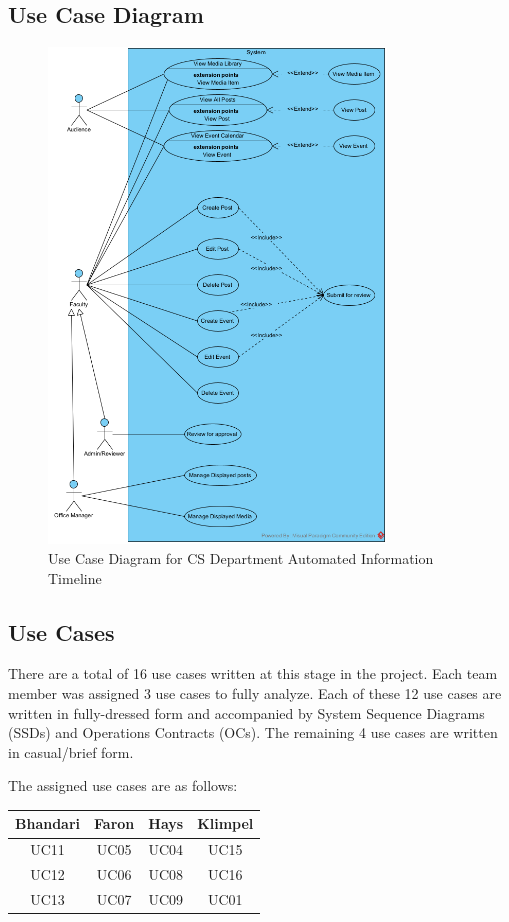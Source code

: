 \documentclass{article}
\begin{document}
\subsection{Use Case Diagram}
\begin{figure}[H]
    \centering
    \includegraphics[width=0.8\textwidth]{images/UCD.png}
    \centering
    \caption{Use Case Diagram for CS Department Automated Information Timeline}
\end{figure}

\subsection{Use Cases}
There are a total of 16 use cases written at this stage in the project. Each team member was assigned 3 use cases to fully analyze. Each of these 12 use cases are written in fully-dressed form and accompanied by System Sequence Diagrams (SSDs) and Operations Contracts (OCs). The remaining 4 use cases are written in casual/brief form.

The assigned use cases are as follows:

\begin{center}
    \begin{tabular}{ | c | c | c | c | }
        \hline
        Bhandari & Faron & Hays & Klimpel \\
        \hline
        UC11 & UC05 & UC04 & UC15 \\
        \hline
        UC12 & UC06 & UC08 & UC16 \\
        \hline
        UC13 & UC07 & UC09 & UC01 \\
        \hline
    \end{tabular}
\end{center}
\end{document}
